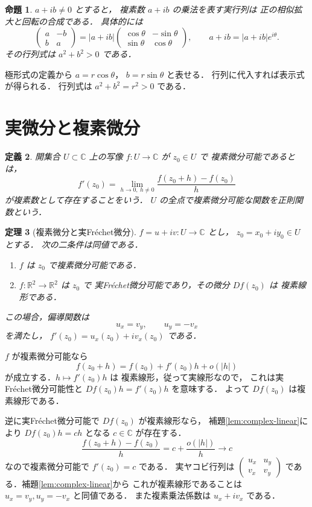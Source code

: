 \documentclass[a5paper,10pt,onecolumn]{jsarticle}
\makeatletter
\theoremstyle{mathnotetheorem}
\newtheorem{theorem}{定理}[section]
\newtheorem{definition}[theorem]{定義}
\newtheorem{proposition}[theorem]{命題}
\renewcommand{\proofname}{証明}
\renewenvironment{proof}[1][\proofname]{%
  \par\pushQED{\qed}\normalfont\topsep4\p@\@plus2\p@\relax
  \trivlist\item[\hskip\labelsep\bfseries #1]\ignorespaces
}{\popQED\endtrivlist\@endpefalse}
\makeatother
\begin{document}
\begin{proposition}\label{prop:rotation}
$a+ib\ne0$ とすると，
複素数 $a+ib$ の乗法を表す実行列は
正の相似拡大と回転の合成である．
具体的には
\[
 \begin{pmatrix}a&-b\\b&a\end{pmatrix}
 =|a+ib|
 \begin{pmatrix}\cos\theta&-\sin\theta\\
                 \sin\theta&\cos\theta\end{pmatrix},
 \qquad a+ib=|a+ib|e^{i\theta}.
\]
その行列式は $a^2+b^2>0$ である．
\end{proposition}
\begin{proof}
極形式の定義から $a=r\cos\theta$，
$b=r\sin\theta$ と表せる．
行列に代入すれば表示式が得られる．
行列式は $a^2+b^2=r^2>0$ である．
\end{proof}

\section{実微分と複素微分}

\begin{definition}
開集合 $U\subset\mathbb C$ 上の写像
$f:U\to\mathbb C$ が $z_0\in U$ で
\emph{複素微分可能}であるとは，
\[
 f'(z_0)=\lim_{h\to0,\ h\ne0}
 \frac{f(z_0+h)-f(z_0)}{h}
\]
が複素数として存在することをいう．
$U$ の全点で複素微分可能な関数を正則関数という．
\end{definition}

\begin{theorem}[複素微分と実Fr\'echet微分]\label{thm:cr}
$f=u+iv:U\to\mathbb C$ とし，
$z_0=x_0+iy_0\in U$ とする．
次の二条件は同値である．
\begin{enumerate}
\item $f$ は $z_0$ で複素微分可能である．
\item $f:\mathbb R^2\to\mathbb R^2$ は $z_0$ で
実Fr\'echet微分可能であり，その微分 $Df(z_0)$ は
複素線形である．
\end{enumerate}
この場合，偏導関数は
\[
 u_x=v_y,\qquad u_y=-v_x
 \tag{CR}
\]
を満たし，
$f'(z_0)=u_x(z_0)+iv_x(z_0)$ である．
\end{theorem}
\begin{proof}
$f$ が複素微分可能なら
\[
 f(z_0+h)=f(z_0)+f'(z_0)h+o(|h|)
\]
が成立する．$h\mapsto f'(z_0)h$ は
複素線形，従って実線形なので，
これは実Fr\'echet微分可能性と
$Df(z_0)h=f'(z_0)h$ を意味する．
よって $Df(z_0)$ は複素線形である．

逆に実Fr\'echet微分可能で
$Df(z_0)$ が複素線形なら，
補題\ref{lem:complex-linear}により
$Df(z_0)h=ch$ となる $c\in\mathbb C$ が存在する．
\[
 \frac{f(z_0+h)-f(z_0)}h
 =c+\frac{o(|h|)}h\longrightarrow c
\]
なので複素微分可能で $f'(z_0)=c$ である．
実ヤコビ行列は
$\begin{pmatrix}u_x&u_y\\v_x&v_y\end{pmatrix}$
である．補題\ref{lem:complex-linear}から
これが複素線形であることは
$u_x=v_y,u_y=-v_x$ と同値である．
また複素乗法係数は $u_x+iv_x$ である．
\end{proof}
\end{document}
